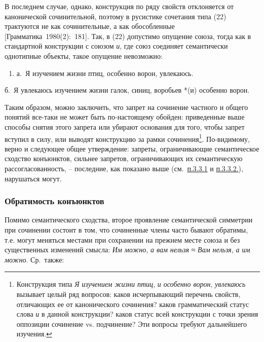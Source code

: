 В последнем случае, однако, конструкция по ряду свойств отклоняется от
канонической сочинительной, поэтому в русистике сочетания типа (22)
трактуются не как сочинительные, а как обособленные
{[}Грамматика~1980(2):~181{]}. Так, в (22) допустимо опущение союза,
тогда как в стандартной конструкции с союзом \emph{и}, где союз
соединяет семантически однотипные объекты, такое опущение невозможно:

\begin{enumerate}
\def\labelenumi{(\arabic{enumi})}
\setcounter{enumi}{22}
\item
  а.~Я изучением жизни птиц, особенно ворон, увлекаюсь.
\end{enumerate}

б.~Я увлекаюсь изучением жизни галок, синиц, воробьев *(и) особенно
ворон.

Таким образом, можно заключить, что запрет на сочинение частного и
общего понятий все-таки не может быть по-настоящему обойден: приведенные
выше способы снятия этого запрета или убирают основания для того, чтобы
запрет вступил в силу, или выводят конструкцию за рамки
сочинения\footnote{Конструкция типа \emph{Я изучением жизни птиц},
  \emph{и особенно ворон}, \emph{увлекаюсь} вызывает целый ряд вопросов:
  каков исчерпывающий перечень свойств, отличающих ее от канонического
  сочинения? каков грамматический статус слова \emph{и} в данной
  конструкции? каков статус всей конструкции с точки зрения оппозиции
  сочинение vs. подчинение? Эти вопросы требуют дальнейшего изучения.}.
По-видимому, верно и следующее общее утверждение: запреты,
ограничивающие семантическое сходство конъюнктов, сильнее запретов,
ограничивающих их семантическую рассогласованность, -- последние, как
показано выше (см.~\underline{п.3.3.1} и \underline{п.3.3.2.}),
нарушаться могут.

\hypertarget{ux43eux431ux440ux430ux442ux438ux43cux43eux441ux442ux44c-ux43aux43eux43dux44aux44eux43dux43aux442ux43eux432}{%
\subsubsection{Обратимость
конъюнктов}\label{ux43eux431ux440ux430ux442ux438ux43cux43eux441ux442ux44c-ux43aux43eux43dux44aux44eux43dux43aux442ux43eux432}}

Помимо семантического сходства, второе проявление семантической
симметрии при сочинении состоит в том, что сочиненные члены часто бывают
обратимы, т.е. могут меняться местами при сохранении на прежнем месте
союза и без существенных изменений смысла: \emph{Им можно}, \emph{а вам
нельзя} ≈ \emph{Вам нельзя}, \emph{а им можно}. Ср.~также:

